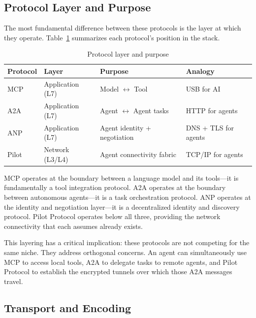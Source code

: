 \documentclass[11pt,a4paper]{article}
\begin{document}
\subsection{Protocol Layer and Purpose}

The most fundamental difference between these protocols is the layer at which they operate. Table~\ref{tab:layer} summarizes each protocol's position in the stack.

\begin{table}[h]
\centering
\caption{Protocol layer and purpose}
\label{tab:layer}
\begin{tabular}{@{}llll@{}}
\toprule
\textbf{Protocol} & \textbf{Layer} & \textbf{Purpose} & \textbf{Analogy} \\
\midrule
MCP & Application (L7) & Model $\leftrightarrow$ Tool & USB for AI \\
A2A & Application (L7) & Agent $\leftrightarrow$ Agent tasks & HTTP for agents \\
ANP & Application (L7) & Agent identity + negotiation & DNS + TLS for agents \\
Pilot & Network (L3/L4) & Agent connectivity fabric & TCP/IP for agents \\
\bottomrule
\end{tabular}
\end{table}

MCP operates at the boundary between a language model and its tools---it is fundamentally a tool integration protocol. A2A operates at the boundary between autonomous agents---it is a task orchestration protocol. ANP operates at the identity and negotiation layer---it is a decentralized identity and discovery protocol. Pilot Protocol operates below all three, providing the network connectivity that each assumes already exists.

This layering has a critical implication: these protocols are not competing for the same niche. They address orthogonal concerns. An agent can simultaneously use MCP to access local tools, A2A to delegate tasks to remote agents, and Pilot Protocol to establish the encrypted tunnels over which those A2A messages travel.

\subsection{Transport and Encoding}
\end{document}
